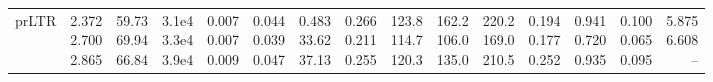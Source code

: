 \begin{landscape}
\begin{table}[t]
{\begin{tabular}{@{}lrrrrrrrrrrrrrr@{}}
prLTR & \makecell[r]{2.372\\2.700\\2.865} & \makecell[r]{59.73\\69.94\\66.84} & \makecell[r]{3.1e4\\3.3e4\\3.9e4} & \makecell[r]{0.007\\0.007\\0.009} & \makecell[r]{0.044\\0.039\\0.047} & \makecell[r]{0.483\\33.62\\37.13} & \makecell[r]{0.266\\0.211\\0.255} & \makecell[r]{123.8\\114.7\\120.3} & \makecell[r]{162.2\\106.0\\135.0} & \makecell[r]{220.2\\169.0\\210.5} & \makecell[r]{0.194\\0.177\\0.252} & \makecell[r]{0.941\\0.720\\0.935} & \makecell[r]{0.100\\0.065\\0.095} & \makecell[r]{5.875\\6.608\\--} \\

\end{tabular}}
\end{table}
\end{landscape}
